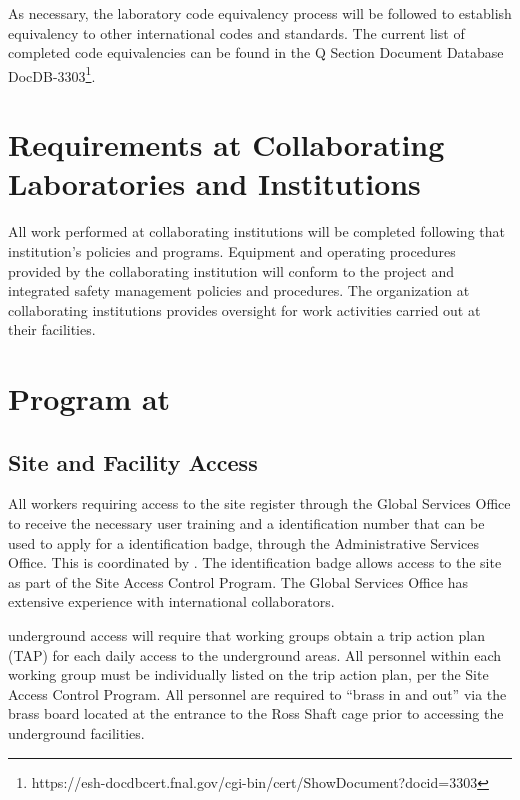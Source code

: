 As necessary, the laboratory code equivalency process will be followed
to establish equivalency to other international codes and
standards. The current list of completed code equivalencies can be
found in the Q Section Document Database DocDB-3303\footnote{https://esh-docdbcert.fnal.gov/cgi-bin/cert/ShowDocument?docid=3303}.


\section{ Requirements at Collaborating Laboratories and Institutions}

All work performed at collaborating institutions will be completed
following that institution's  policies and
programs. Equipment and operating procedures provided by the
collaborating institution will conform to the  project
 and integrated safety management policies and
procedures. The  organization at collaborating institutions
provides  oversight for work activities carried
out at their facilities.

\section{  Program at }

\subsection{Site and Facility Access}

All  workers requiring access to the  site
register through the \fnal Global Services Office to receive the
necessary user training and a \fnal identification number that can be
used to apply for a  identification badge, through the
 Administrative Services Office. This is coordinated by
. The  identification badge allows access to
the  site as part of the  Site Access Control
Program. The \fnal Global Services Office has extensive experience
with international collaborators.


 underground access will require that working groups
obtain a trip action plan (TAP) for each daily access to the
underground areas.  All personnel within each working group must be
individually listed on the trip action plan, per the  Site
Access Control Program. All personnel are required to ``brass in and
out'' via the brass board located at the entrance to the Ross Shaft
cage prior to accessing the underground facilities.

